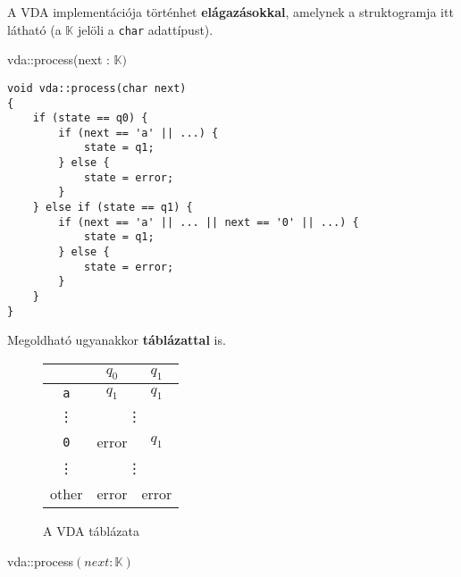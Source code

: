 A VDA implementációja történhet \textbf{elágazásokkal}, amelynek a struktogramja itt látható (a $\mathbb{K}$ jelöli a \texttt{char} adattípust).

\begin{stuki*}[14cm]{vda::process(next : $\mathbb{K})$}
	\begin{CASE}{2}{2}
		\begin{IF}{1}{}
			\ELSE
		\end{IF}
		\begin{IF}{1}{}
			\ELSE
		\end{IF}
	\end{CASE}
\end{stuki*}

\begin{lstlisting}[style=cppstyle, caption={VDA implementációja elágazásokkal}]
void vda::process(char next) 
{
	if (state == q0) {
		if (next == 'a' || ...) {
		    state = q1;
		} else {
		    state = error;
		}
	} else if (state == q1) {
		if (next == 'a' || ... || next == '0' || ...) {
		    state = q1;
		} else {
		    state = error;
		}
	}
}
\end{lstlisting}

Megoldható ugyanakkor \textbf{táblázattal} is.

\begin{figure}[h!]
	\centering
	\begin{tabular}{c||cc}
		& $q_0$ & $q_1$ \\
		\hline\hline
		\texttt{a} & $q_1$ & $q_1$ \\
		\hline
		\vdots & \multicolumn{2}{c}{\vdots} \\
		\hline
		\texttt{0} & error & $q_1$ \\
		\hline
		\vdots & \multicolumn{2}{c}{\vdots} \\
		\hline
		other & error & error \\
	\end{tabular}
	\caption{A VDA táblázata}
\end{figure}

\begin{stuki*}{vda::process$(next : \mathbb{K})$}
	\begin{IF}[80]{1}{}
		\ELSE
	\end{IF}
\end{stuki*}

